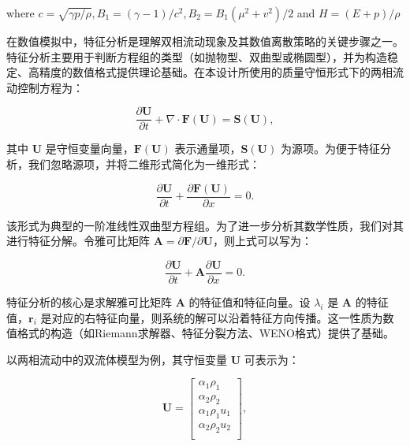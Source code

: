 \documentclass{article}
\numberwithin{equation}{section}    %
\begin{document}
where  $c=\sqrt{\gamma p / \rho}, B_{1}=(\gamma-1) / c^{2}, B_{2}=B_{1}\left(\mu^{2}+v^{2}\right) / 2$  and  $H=(E+p) / \rho$

在数值模拟中，特征分析是理解双相流动现象及其数值离散策略的关键步骤之一。特征分析主要用于判断方程组的类型（如抛物型、双曲型或椭圆型），并为构造稳定、高精度的数值格式提供理论基础。在本设计所使用的质量守恒形式下的两相流动控制方程为：

\begin{equation}
    \frac{\partial \mathbf{U}}{\partial t} + \nabla \cdot \mathbf{F}(\mathbf{U}) = \mathbf{S}(\mathbf{U}),
\end{equation}

其中 $\mathbf{U}$ 是守恒变量向量，$\mathbf{F}(\mathbf{U})$ 表示通量项，$\mathbf{S}(\mathbf{U})$ 为源项。为便于特征分析，我们忽略源项，并将二维形式简化为一维形式：

\begin{equation}
    \frac{\partial \mathbf{U}}{\partial t} + \frac{\partial \mathbf{F}(\mathbf{U})}{\partial x} = 0.
\end{equation}

该形式为典型的一阶准线性双曲型方程组。为了进一步分析其数学性质，我们对其进行特征分解。令雅可比矩阵 $\mathbf{A} = \partial \mathbf{F} / \partial \mathbf{U}$，则上式可以写为：

\begin{equation}
    \frac{\partial \mathbf{U}}{\partial t} + \mathbf{A} \frac{\partial \mathbf{U}}{\partial x} = 0.
\end{equation}

特征分析的核心是求解雅可比矩阵 $\mathbf{A}$ 的特征值和特征向量。设 $\lambda_i$ 是 $\mathbf{A}$ 的特征值，$\mathbf{r}_i$ 是对应的右特征向量，则系统的解可以沿着特征方向传播。这一性质为数值格式的构造（如Riemann求解器、特征分裂方法、WENO格式）提供了基础。

以两相流动中的双流体模型为例，其守恒变量 $\mathbf{U}$ 可表示为：

\begin{equation}
    \mathbf{U} = \begin{bmatrix}
    \alpha_1 \rho_1 \\
    \alpha_2 \rho_2 \\
    \alpha_1 \rho_1 u_1 \\
    \alpha_2 \rho_2 u_2 \\
    \end{bmatrix},
\end{equation}
\end{document}
